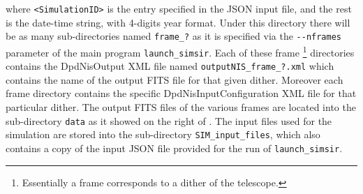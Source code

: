 where \verb+<SimulationID>+ is the entry specified in the JSON input file, and the rest is the date-time string, with 4-digits year format. Under this directory there will be as many sub-directories named \verb+frame_?+ as it is specified via the \verb+--nframes+ parameter of the main program \verb+launch_simsir+. Each of these frame \footnote{Essentially a frame corresponds to a dither of the telescope.} directories contains the DpdNisOutput XML file named \verb+outputNIS_frame_?.xml+ which contains the name of the output FITS file for that given dither. Moreover each frame directory contains the specific DpdNisInputConfiguration XML file for that particular dither. The output FITS files of the various frames are located into the sub-directory \verb+data+ as it showed on the right of . The input files used for the simulation are stored into the sub-directory \verb+SIM_input_files+, which also contains a copy of the input JSON file provided for the run of \verb+launch_simsir+.